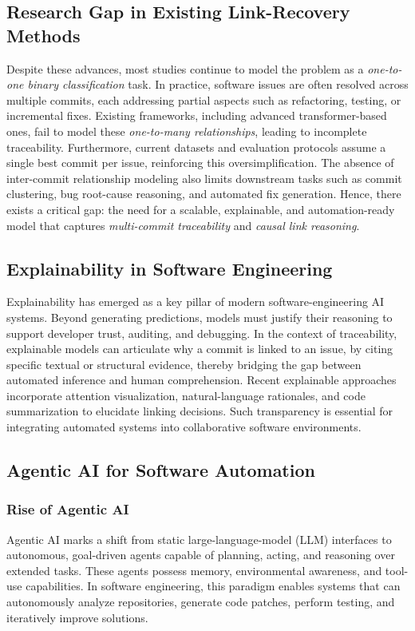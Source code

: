 \subsection{Research Gap in Existing Link-Recovery Methods}
Despite these advances, most studies continue to model the problem as a \emph{one-to-one binary classification} task. In practice, software issues are often resolved across multiple commits, each addressing partial aspects such as refactoring, testing, or incremental fixes. Existing frameworks, including advanced transformer-based ones, fail to model these \emph{one-to-many relationships}, leading to incomplete traceability.  
Furthermore, current datasets and evaluation protocols assume a single best commit per issue, reinforcing this oversimplification. The absence of inter-commit relationship modeling also limits downstream tasks such as commit clustering, bug root-cause reasoning, and automated fix generation.  
Hence, there exists a critical gap: the need for a scalable, explainable, and automation-ready model that captures \emph{multi-commit traceability} and \emph{causal link reasoning}.

\subsection{Explainability in Software Engineering}
Explainability has emerged as a key pillar of modern software-engineering AI systems. Beyond generating predictions, models must justify their reasoning to support developer trust, auditing, and debugging.  
In the context of traceability, explainable models can articulate why a commit is linked to an issue, by citing specific textual or structural evidence, thereby bridging the gap between automated inference and human comprehension.  
Recent explainable approaches incorporate attention visualization, natural-language rationales, and code summarization to elucidate linking decisions. Such transparency is essential for integrating automated systems into collaborative software environments.

\subsection{Agentic AI for Software Automation}
\subsubsection*{Rise of Agentic AI}
Agentic AI marks a shift from static large-language-model (LLM) interfaces to autonomous, goal-driven agents capable of planning, acting, and reasoning over extended tasks. These agents possess memory, environmental awareness, and tool-use capabilities. In software engineering, this paradigm enables systems that can autonomously analyze repositories, generate code patches, perform testing, and iteratively improve solutions.\\

